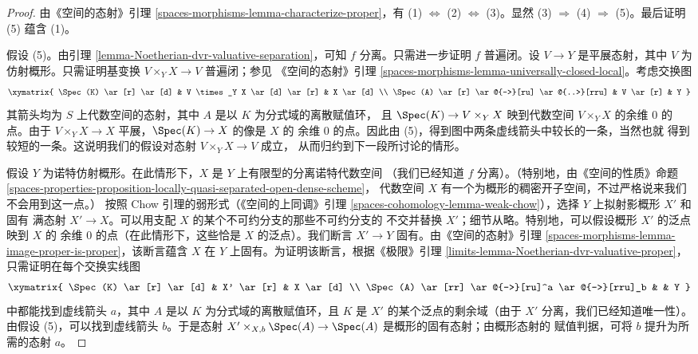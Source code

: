 \begin{proof}
由《空间的态射》引理
\ref{spaces-morphisms-lemma-characterize-proper}，有
(1) $\Leftrightarrow$ (2) $\Leftrightarrow$ (3)。显然
(3) $\Rightarrow$ (4) $\Rightarrow$ (5)。最后证明 (5) 蕴含 (1)。

\medskip\noindent
假设 (5)。由引理 \ref{lemma-Noetherian-dvr-valuative-separation}，可知
$f$ 分离。只需进一步证明 $f$ 普遍闭。设 $V \to Y$ 是平展态射，其中
$V$ 为仿射概形。只需证明基变换 $V \times_Y X \to V$ 普遍闭；参见
《空间的态射》引理
\ref{spaces-morphisms-lemma-universally-closed-local}。考虑交换图
$$
\xymatrix{
\Spec(K) \ar[r] \ar[d] & V \times_Y X \ar[d] \ar[r] & X \ar[d] \\
\Spec(A) \ar[r] \ar@{-->}[ru] \ar@{..>}[rru] & V \ar[r] & Y
}
$$
其箭头均为 $S$ 上代数空间的态射，其中 $A$ 是以 $K$ 为分式域的离散赋值环，
且 $\Spec(K) \to V \times_Y X$ 映到代数空间 $V \times_Y X$ 的余维 $0$
的点。由于 $V \times_Y X \to X$ 平展，$\Spec(K) \to X$ 的像是 $X$ 的
余维 $0$ 的点。因此由 (5)，得到图中两条虚线箭头中较长的一条，当然也就
得到较短的一条。这说明我们的假设对态射 $V \times_Y X \to V$ 成立，
从而归约到下一段所讨论的情形。

\medskip\noindent
假设 $Y$ 为诺特仿射概形。在此情形下，$X$ 是 $Y$ 上有限型的分离诺特代数空间
（我们已经知道 $f$ 分离）。（特别地，由《空间的性质》命题
\ref{spaces-properties-proposition-locally-quasi-separated-open-dense-scheme}，
代数空间 $X$ 有一个为概形的稠密开子空间，不过严格说来我们不会用到这一点。）
按照 Chow 引理的弱形式（《空间的上同调》引理
\ref{spaces-cohomology-lemma-weak-chow}），选择 $Y$ 上拟射影概形 $X'$ 和固有
满态射 $X' \to X$。可以用支配 $X$ 的某个不可约分支的那些不可约分支的
不交并替换 $X'$；细节从略。特别地，可以假设概形 $X'$ 的泛点映到 $X$ 的
余维 $0$ 的点（在此情形下，这些恰是 $X$ 的泛点）。我们断言
$X' \to Y$ 固有。由《空间的态射》引理
\ref{spaces-morphisms-lemma-image-proper-is-proper}，该断言蕴含 $X$ 在 $Y$
上固有。为证明该断言，根据《极限》引理
\ref{limits-lemma-Noetherian-dvr-valuative-proper}，只需证明在每个交换实线图
$$
\xymatrix{
\Spec(K) \ar[r] \ar[d] & X' \ar[r] & X \ar[d] \\
\Spec(A) \ar[rr] \ar@{-->}[ru]^a \ar@{-->}[rru]_b & & Y
}
$$
中都能找到虚线箭头 $a$，其中 $A$ 是以 $K$ 为分式域的离散赋值环，且
$K$ 是 $X'$ 的某个泛点的剩余域（由于 $X'$ 分离，我们已经知道唯一性）。
由假设 (5)，可以找到虚线箭头 $b$。于是态射
$X' \times_{X, b} \Spec(A) \to \Spec(A)$ 是概形的固有态射；由概形态射的
赋值判据，可将 $b$ 提升为所需的态射 $a$。
\end{proof}


